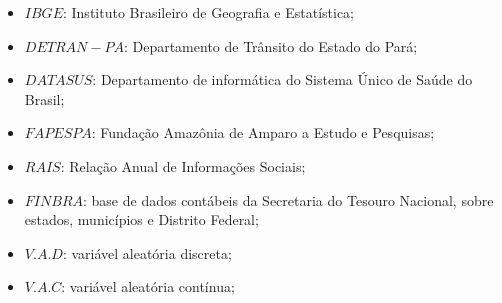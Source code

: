 \begin{refsection}
\begin{itemize}
\item $IBGE$: Instituto Brasileiro de Geografia e Estatística;
\item $DETRAN-PA$: Departamento de Trânsito do Estado do Pará;
\item $DATASUS$: Departamento de informática do Sistema Único de Saúde do Brasil; 
\item $FAPESPA$: Fundação Amazônia de Amparo a Estudo e Pesquisas;
\item $RAIS$: Relação Anual de Informações Sociais;
\item $FINBRA$:  base de dados contábeis da Secretaria do Tesouro Nacional, sobre estados, municípios e Distrito Federal; 
 \item $V.A.D$: variável aleatória discreta;
\item $V.A.C$: variável aleatória contínua;
\end{itemize}




\printbibliography[heading=subbibliography]
\end{refsection}